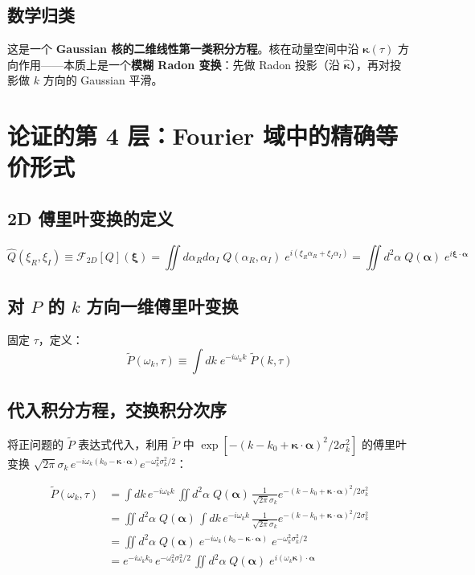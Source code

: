 \documentclass[12pt,a4paper]{ctexart}
\begin{document}
\subsection{数学归类}

这是一个 \textbf{Gaussian 核的二维线性第一类积分方程}。核在动量空间中沿 $\boldsymbol{\kappa}(\tau)$ 方向作用——本质上是一个\textbf{模糊 Radon 变换}：先做 Radon 投影（沿 $\hat{\boldsymbol{\kappa}}$），再对投影做 $k$ 方向的 Gaussian 平滑。

\section{论证的第 4 层：Fourier 域中的精确等价形式}

\subsection{2D 傅里叶变换的定义}

\begin{equation}
\hat{Q}(\xi_R,\xi_I) \equiv \mathcal{F}_{2D}[Q](\boldsymbol{\xi})
= \iint d\alpha_R d\alpha_I\;
Q(\alpha_R,\alpha_I)\;
e^{i(\xi_R\alpha_R + \xi_I\alpha_I)}
= \iint d^2\alpha\; Q(\boldsymbol{\alpha})\; e^{i\boldsymbol{\xi}\cdot\boldsymbol{\alpha}}
\end{equation}

\subsection{对 $P$ 的 $k$ 方向一维傅里叶变换}

固定 $\tau$，定义：
\begin{equation}
\tilde{P}(\omega_k,\tau) \equiv \int dk\; e^{-i\omega_k k}\; \tilde{P}(k,\tau)
\end{equation}

\subsection{代入积分方程，交换积分次序}

将正问题的 $\tilde{P}$ 表达式代入，利用 $\tilde{P}$ 中 $\exp[-(k-k_0+\boldsymbol{\kappa}\!\cdot\!\boldsymbol{\alpha})^2/2\sigma_k^2]$ 的傅里叶变换 $\sqrt{2\pi}\sigma_k\,e^{-i\omega_k(k_0-\boldsymbol{\kappa}\!\cdot\!\boldsymbol{\alpha})}e^{-\omega_k^2\sigma_k^2/2}$：

\begin{align}
\tilde{P}(\omega_k,\tau) &= \int dk\,e^{-i\omega_k k}\,
\iint d^2\alpha\; Q(\boldsymbol{\alpha})\,
\frac{1}{\sqrt{2\pi}\sigma_k}
e^{-(k-k_0+\boldsymbol{\kappa}\!\cdot\!\boldsymbol{\alpha})^2/2\sigma_k^2} \\
&= \iint d^2\alpha\; Q(\boldsymbol{\alpha})\,
\int dk\,e^{-i\omega_k k}\,
\frac{1}{\sqrt{2\pi}\sigma_k}
e^{-(k-k_0+\boldsymbol{\kappa}\!\cdot\!\boldsymbol{\alpha})^2/2\sigma_k^2} \\
&= \iint d^2\alpha\; Q(\boldsymbol{\alpha})\;
e^{-i\omega_k(k_0-\boldsymbol{\kappa}\!\cdot\!\boldsymbol{\alpha})}\;
e^{-\omega_k^2\sigma_k^2/2} \\
&= e^{-i\omega_k k_0}\,
e^{-\omega_k^2\sigma_k^2/2}\,
\iint d^2\alpha\; Q(\boldsymbol{\alpha})\; e^{i(\omega_k\boldsymbol{\kappa})\cdot\boldsymbol{\alpha}}
\end{align}
\end{document}
